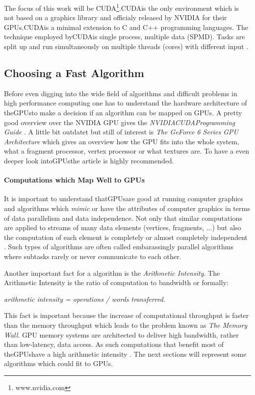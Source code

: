 The focus of this work will be CUDA\footnote{www.nvidia.com}.\gls{CUDA}is the only
environment which is not based on a graphics library and officialy released by
NVIDIA for their GPUs.\gls{CUDA}is a minimal extension to C and C++ programming
languages. The technique employed by\gls{CUDA}is single process, multiple data
(SPMD). Tasks are split up and run simultaneously on multiple threads (cores)
with different input \citep{citeulike:3072519}.

\subsection*{Choosing a Fast Algorithm} %
\label{ssub:choosing_a_fast_algorithm}
Before even digging into the wide field of algorithms and difficult problems in
high performance computing one has to understand the hardware architecture of
the\glspl{GPU}to make a decision if an algorithm can be mapped on GPUs. A pretty good
overview over the NVIDIA \gls{GPU} gives the \emph{NVIDIA\gls{CUDA}Programming Guide}
\citep{citeulike:3325943}. A little bit outdatet but still of interest is
\emph{The GeForce 6 Series \gls{GPU} Architecture}\citep{citeulike:3757915} which gives
an overview how the \gls{GPU} fits into the whole system, what a fragment processor,
vertex processor or what textures are. To have a even deeper look into\glspl{GPU}the
article \citep{citeulike:2790995} is highly recommended.

\paragraph{Computations which Map Well to GPUs} %
\label{par:computations_which_map_well_to_GPUs}
It is important to understand that\glspl{GPU}are good at running computer graphics
and algorithms which \emph{mimic} or have the attributes of computer graphics in
terms of data parallelism and data independence. Not only that similar
computations are applied to streams of many data elements (vertices, fragments,
...) but also the computation of each element is completely or almost completely
independent \citep{citeulike:3733428}. Such types of algorithms are often called
embarassingly parallel algorithms where subtasks rarely or never communicate to
each other.

Another important fact for a algorithm is the \emph{Arithmetic Intensity}. The
Arithmetic Intensity is the ratio of computation to bandwidth or formally:
\begin{center} 
 \emph{arithmetic intensity = operations / words transferred.}
\end{center}
This fact is important because the increase of computational throughput is
faster than the memory throughput which leads to the problem known as \emph{The
Memory Wall}. \gls{GPU} memory systems are architected to deliver high bandwidth,
rather than low-latency, data access. As such computations that benefit most of
the\glspl{GPU}have a high arithmetic intensity \citep{citeulike:3733428}. The next 
sections will represent some algorithms which could fit to GPUs. 

